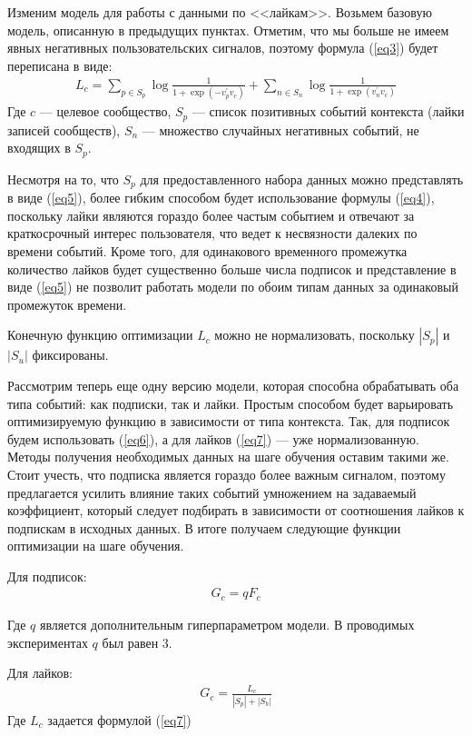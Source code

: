 \documentclass[times,specification,annotation]{itmo-student-thesis}
\begin{document}
Изменим модель для работы с данными по <<лайкам>>. Возьмем базовую модель, описанную в предыдущих пунктах. Отметим, что мы больше не имеем явных негативных пользовательских сигналов, поэтому формула (\ref{eq3}) будет переписана в виде:
\begin{align}
L_c = \sum_{p \in S_p} \log \frac{1}{1 + \exp(-v_p^{'}v_c)} + \sum_{n \in S_n} \log \frac{1}{1 + \exp(v_n^{'}v_c)} \label{eq7}
 \end{align}
Где $c$ --- целевое сообщество, $S_p$ --- список позитивных событий
контекста (лайки записей сообществ), $S_n$ --- множество случайных негативных событий, не входящих в $S_p$. 

Несмотря на то, что $S_p$ для предоставленного набора данных можно представлять в виде (\ref{eq5}), более гибким способом будет использование формулы (\ref{eq4}), поскольку лайки являются гораздо более частым событием и отвечают за краткосрочный интерес пользователя, что ведет к несвязности далеких по времени событий. Кроме того, для одинакового временного промежутка количество лайков будет существенно больше числа подписок и представление в виде (\ref{eq5}) не позволит работать модели по обоим типам данных за одинаковый промежуток времени. 

Конечную функцию оптимизации  $L_c$ можно не нормализовать, поскольку $|S_p|$ и $|S_u|$ фиксированы.

Рассмотрим теперь еще одну версию модели, которая способна обрабатывать оба типа событий: как подписки, так и лайки. Простым способом будет варьировать оптимизируемую функцию в зависимости от типа контекста. Так, для подписок будем использовать (\ref{eq6}), а для лайков (\ref{eq7}) --- уже нормализованную. Методы получения необходимых данных на шаге обучения оставим такими же. Стоит учесть, что подписка является гораздо более важным сигналом, поэтому предлагается усилить влияние таких событий умножением на задаваемый коэффициент, который следует подбирать в зависимости от соотношения лайков к подпискам в исходных данных. В итоге получаем следующие функции оптимизации на шаге обучения.

Для подписок:
\begin{align*}
G_c = qF_c
\end{align*}

Где $q$ является дополнительным гиперпараметром модели. В проводимых экспериментах $q$ был равен 3.

Для лайков:
\begin{align*}
G_c = \frac{L_c}{|S_p| +|S_b|} 
\end{align*}
Где $L_c$ задается формулой  (\ref{eq7})
\end{document}
